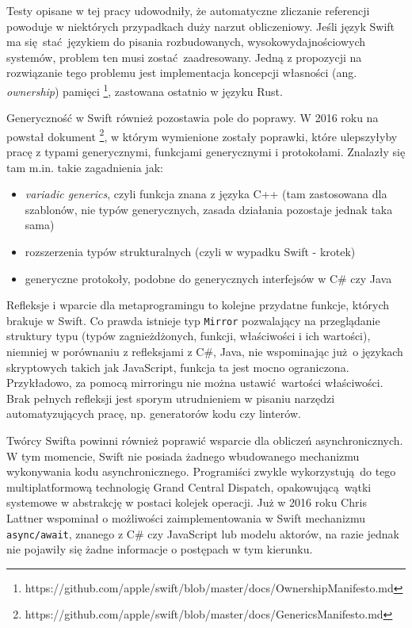 \documentclass[mgr, shortabstract]{iithesis}
\newcommand{\ang}[1]{ang. \textit{#1}}
\newcommand{\swiftinline}[1]{
    \texttt{#1}
}
\begin{document}
Testy opisane w tej pracy udowodniły, że automatyczne zliczanie referencji powoduje w niektórych przypadkach duży narzut obliczeniowy. Jeśli język Swift ma się stać językiem do pisania rozbudowanych, wysokowydajnościowych systemów, problem ten musi zostać zaadresowany. Jedną z propozycji na rozwiązanie tego problemu jest implementacja koncepcji własności (\ang{ownership}) pamięci \footnote{https://github.com/apple/swift/blob/master/docs/OwnershipManifesto.md}, zastowana ostatnio w języku Rust. 

Generyczność w Swift również pozostawia pole do poprawy. W 2016 roku na powstał dokument \footnote{https://github.com/apple/swift/blob/master/docs/GenericsManifesto.md}, w którym wymienione zostały poprawki, które ulepszyłyby pracę z typami generycznymi, funkcjami generycznymi i protokołami. Znalazły się tam m.in. takie zagadnienia jak:
\begin{itemize}
    \item \textit{variadic generics}, czyli funkcja znana z języka C++ (tam zastosowana dla szablonów, nie typów generycznych, zasada działania pozostaje jednak taka sama)
    \item rozszerzenia typów strukturalnych (czyli w wypadku Swift - krotek)
    \item generyczne protokoły, podobne do generycznych interfejsów w C\# czy Java
\end{itemize}

Refleksje i wparcie dla metaprogramingu to kolejne przydatne funkcje, których brakuje w Swift. Co prawda istnieje typ \swiftinline{Mirror} pozwalający na przeglądanie struktury typu (typów zagnieżdżonych, funkcji, właściwości i ich wartości), niemniej w porównaniu z refleksjami z C\#, Java, nie wspominając już o językach skryptowych takich jak JavaScript, funkcja ta jest mocno ograniczona. Przykładowo, za pomocą mirroringu nie można ustawić wartości właściwości. Brak pełnych refleksji jest sporym utrudnieniem w pisaniu narzędzi automatyzujących pracę, np.  generatorów kodu czy linterów.

Twórcy Swifta powinni również poprawić wsparcie dla obliczeń asynchronicznych. W tym momencie, Swift nie posiada żadnego wbudowanego mechanizmu wykonywania kodu asynchronicznego. Programiści zwykle wykorzystują do tego multiplatformową technologię Grand Central Dispatch, opakowującą wątki systemowe w abstrakcję w postaci kolejek operacji. Już w 2016 roku Chris Lattner wspominał o możliwości zaimplementowania w Swift mechanizmu \texttt{async/await}, znanego z C\# czy JavaScript lub modelu aktorów, na razie jednak nie pojawiły się żadne informacje o postępach w tym kierunku.
\end{document}
